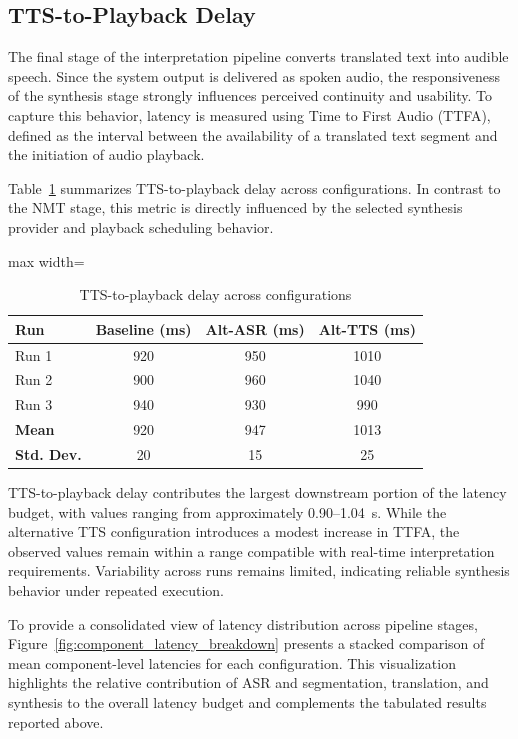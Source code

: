 \subsection{TTS-to-Playback Delay}
\label{sec:tts_playback_delay}

The final stage of the interpretation pipeline converts translated text into audible speech. Since the system output is delivered as spoken audio, the responsiveness of the synthesis stage strongly influences perceived continuity and usability. To capture this behavior, latency is measured using Time to First Audio (TTFA), defined as the interval between the availability of a translated text segment and the initiation of audio playback.


Table~\ref{tab:tts_playback_delay} summarizes TTS-to-playback delay across configurations. In contrast to the NMT stage, this metric is directly influenced by the selected synthesis provider and playback scheduling behavior.

\begin{table}[!htbp]
\centering
\caption[TTS-to-playback delay]{TTS-to-playback delay across configurations}
\label{tab:tts_playback_delay}
\begin{adjustbox}{max width=\textwidth}
\begin{tabular}{lccc}
\toprule
\textbf{Run} & \textbf{Baseline (ms)} & \textbf{Alt-ASR (ms)} & \textbf{Alt-TTS (ms)} \\
\midrule
Run 1 & 920 & 950 & 1010 \\
Run 2 & 900 & 960 & 1040 \\
Run 3 & 940 & 930 & 990 \\
\midrule
\textbf{Mean} & 920 & 947 & 1013 \\
\textbf{Std. Dev.} & 20 & 15 & 25 \\
\bottomrule
\end{tabular}
\end{adjustbox}
\end{table}

TTS-to-playback delay contributes the largest downstream portion of the latency budget, with values ranging from approximately 0.90--1.04~s. While the alternative TTS configuration introduces a modest increase in TTFA, the observed values remain within a range compatible with real-time interpretation requirements. Variability across runs remains limited, indicating reliable synthesis behavior under repeated execution.

To provide a consolidated view of latency distribution across pipeline stages, Figure~\ref{fig:component_latency_breakdown} presents a stacked comparison of mean component-level latencies for each configuration. This visualization highlights the relative contribution of ASR and segmentation, translation, and synthesis to the overall latency budget and complements the tabulated results reported above.



